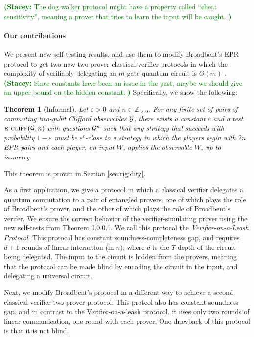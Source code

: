 \documentclass[11pt]{article}
\newtheorem{theorem}{Theorem}
\theoremstyle{remark}
\theoremstyle{definition}
\newcommand{\eps}{\varepsilon}
\newcommand{\snote}[1]{\textcolor{green}{\small {\textbf{(Stacey:} #1 \textbf{) }}}}
\begin{document}
\snote{The dog walker protocol might have a property called ``cheat sensitivity'', meaning a prover that tries to learn the input will be caught.}

\paragraph{Our contributions} We present new self-testing results, and use them to modify Broadbent's EPR protocol to get two new two-prover classical-verifier protocols in which the complexity of verifiably delegating an $m$-gate quantum circuit is $O(m)$ \cite{}. \snote{Since constants have been an issue in the past, maybe we should give an upper bound on the hidden constant.}
Specifically, we show the following:

\begin{theorem}[Informal]
Let $\eps>0$ and $n\in\mathbb{Z}_{>0}$. For any finite set of pairs of commuting two-qubit Clifford observables $\cal G$, there exists a constant $c$ and a test $\textsc{e-cliff}({\cal G},n)$ with questions ${\cal G}^{n}$ such that any strategy that succeeds with probability $1-\eps$ must be $\eps^c$-close to a strategy in which the players begin with $2n$ EPR-pairs and each player, on input $W$, applies the observable $W$, up to isometry. 
\end{theorem}

This theorem is proven in Section \ref{sec:rigidity}. 

As a first application, we give a protocol in which a classical verifier delegates a quantum computation to a pair of entangled provers, one of which plays the role of Broadbent's prover, and the other of which plays the role of Broadbent's verifer. We ensure the correct behavior of the verifier-simulating prover using the new self-tests from Theorem \ref{}. We call this protocol the \emph{Verifier-on-a-Leash Protocol}. This protocol has constant soundness-completeness gap, and requires $d+1$ rounds of linear interaction (in $n$), where $d$ is the $T$-depth of the circuit being delegated. The input to the circuit is hidden from the provers, meaning that the protocol can be made blind by encoding the circuit in the input, and delegating a universal circuit. 

Next, we modify Broadbent's protocol in a different way to achieve a second classical-verifier two-prover protocol. This protcol also has constant soundness gap, and in contrast to the Verifier-on-a-leash protocol, it uses only two rounds of linear communication, one round with each prover. One drawback of this protocol is that it is not blind. 
\end{document}
